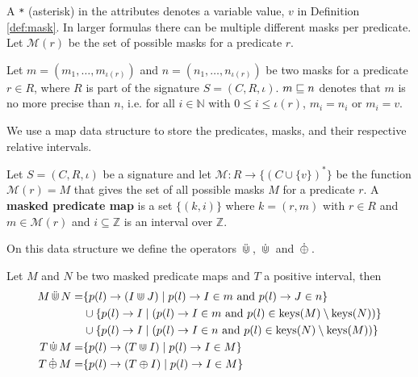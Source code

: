 A \texttt{*} (asterisk) in the attributes denotes a variable value, $v$ in Definition \ref{def:mask}.
In larger formulas there can be multiple different masks per predicate.
Let $\mathcal{M}(r)$ be the set of possible masks for a predicate $r$.

\begin{definition}
    \label{def:mask-precision-comparison}
    Let $m = (m_1, \dots, m_{\iota(r)})$ and $n = (n_1, \dots, n_{\iota(r)})$ be two masks for a predicate $r \in R$, where $R$ is part of the signature $S = (C,R,\iota)$.
    $m \sqsubseteq n$ denotes that $m$ is no more precise than $n$, i.e. for all $i \in \mathbb{N}$ with $0 \leq i \leq \iota(r)$, $m_i = n_i$ or $m_i = v$.
\end{definition}

We use a map data structure to store the predicates, masks, and their respective relative intervals.

\begin{definition}
    \label{def:map}
    Let $S=(C,R,\iota)$ be a signature and let $\mathcal{M} : R \to \{(C \cup \{v\})^*\}$ be the function $\mathcal{M}(r) = M$ that gives the set of all possible masks $M$ for a predicate $r$.
    A \textbf{masked predicate map} is a set $\{(k,i)\}$ where $k = (r,m)$ with $r \in R$ and $m \in \mathcal{M}(r)$ and $i \subseteq \mathbb{Z}$ is an interval over $\mathbb{Z}$. 
\end{definition}


On this data structure we define the operators $\,\ddot{\Cup}\,$, $\,\dot{\Cup}\,$ and $\,\dot{\oplus}\,$.

\begin{definition}
    \label{def:e-rel-int-ops}
    Let $M$ and $N$ be two masked predicate maps and $T$ a positive interval, then 
    \begin{align*}
        M \,\ddot{\Cup}\, N = 
            & \{ p(l) \rightarrow (I \Cup J) \mid 
                p(l) \rightarrow I \in m \text{ and } 
                p(l) \rightarrow J \in n \} \\
            & \cup \{p(l) \rightarrow I \mid  
                (p(l) \rightarrow I \in m \text{ and }
                p(l) \in \operatorname{keys}(M) \setminus \operatorname{keys}(N)) \} \\
            & \cup \{p(l) \rightarrow I \mid  
                (p(l) \rightarrow I \in n \text{ and }
                p(l) \in \operatorname{keys}(N) \setminus \operatorname{keys}(M))
                \}        
                \\
        T \,\dot{\Cup}\, M = 
            & \{ p(l) \rightarrow (T \Cup I) \mid 
                p(l) \rightarrow I \in M \} \\
        T \,\dot{\oplus}\, M = 
            & \{ p(l) \rightarrow (T \oplus I) \mid 
                p(l) \rightarrow I \in M \} \\
    \end{align*}
\end{definition}

